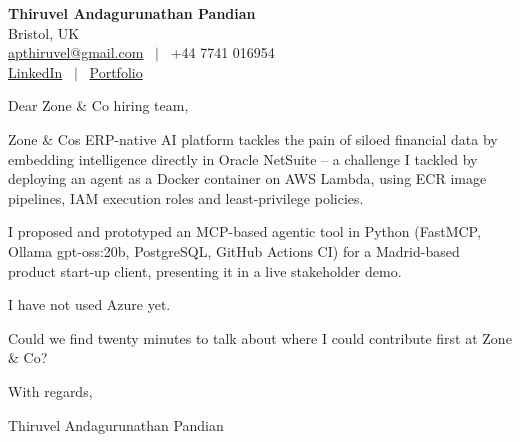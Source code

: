\documentclass[11pt,a4paper]{article}
\begin{document}
\raggedright
\pagestyle{empty}

\begin{center}
    {\LARGE \color{linkblue} \textbf{Thiruvel Andagurunathan Pandian}}\\[0.2cm]
    Bristol, UK \\
    \href{mailto:apthiruvel@gmail.com}{apthiruvel@gmail.com} \ $|$ \ +44 7741 016954 \\
\href{https://www.linkedin.com/in/thiruvel-a-p/}{LinkedIn} \ $|$ \ \href{https://thiruvel-ap.github.io/PersonalPortfolio/}{Portfolio}
\end{center}

\vspace{0.4cm}

\noindent
Dear Zone \& Co hiring team,

Zone \& Co\textquotesingle{}s ERP-native AI platform tackles the pain of siloed financial data by embedding intelligence directly in Oracle NetSuite – a challenge I tackled by deploying an agent as a Docker container on AWS Lambda, using ECR image pipelines, IAM execution roles and least-privilege policies.

I proposed and prototyped an MCP-based agentic tool in Python (FastMCP, Ollama gpt-oss:20b, PostgreSQL, GitHub Actions CI) for a Madrid-based product start-up client, presenting it in a live stakeholder demo.

I have not used Azure yet.

Could we find twenty minutes to talk about where I could contribute first at Zone \& Co?

\vspace{0.5cm}

With regards,

Thiruvel Andagurunathan Pandian
\end{document}
